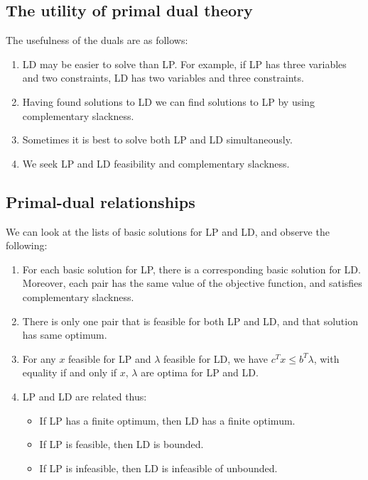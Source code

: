 \documentclass[12pt]{article}
\theoremstyle{definition}
\theoremstyle{remark}
\begin{document}
\subsection{The utility of primal dual theory}%
\label{sub:the_utility_of_primal_dual_theory}

The usefulness of the duals are as follows:
\begin{enumerate}[1.]
	\item LD may be easier to solve than LP. For example, if LP has three variables and two constraints, LD has two variables and three constraints.
	\item Having found solutions to LD we can find solutions to LP by using complementary slackness.
	\item Sometimes it is best to solve both LP and LD simultaneously.
	\item We seek LP and LD feasibility and complementary slackness.
\end{enumerate}

\subsection{Primal-dual relationships}%
\label{sub:primal_dual_relationships}

We can look at the lists of basic solutions for LP and LD, and observe the following:

\begin{enumerate}[1.]
	\item For each basic solution for LP, there is a corresponding basic solution for LD. Moreover, each pair has the same value of the objective function, and satisfies complementary slackness.
	\item There is only one pair that is feasible for both LP and LD, and that solution has same optimum.
	\item For any $x$ feasible for LP and $\lambda$ feasible for LD, we have $c^{T}x \leq b^{T}\lambda$, with equality if and only if $x$, $\lambda$ are optima for LP and LD.
	\item LP and LD are related thus:
		\begin{itemize}
			\item If LP has a finite optimum, then LD has a finite optimum.
			\item If LP is feasible, then LD is bounded.
			\item If LP is infeasible, then LD is infeasible of unbounded.
		\end{itemize}
		
\end{enumerate}
\end{document}
